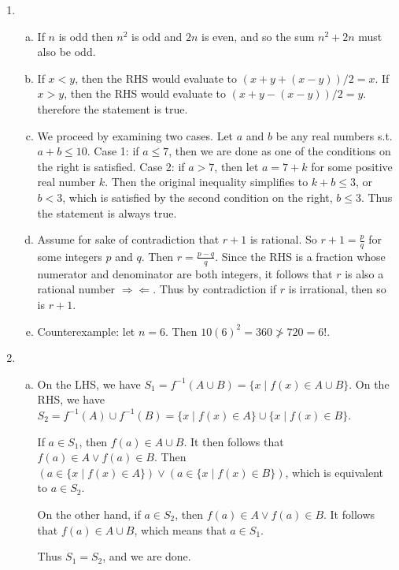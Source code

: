 \begin{enumerate}
    \item\begin{enumerate}[(a)]
        \item {} If $n$ is odd then $n^2$ is odd and $2n$ is even, and so the sum $n^2+2n$ must also be odd.
        \item {} If $x<y$, then the RHS would evaluate to $(x+y+(x-y))/2=x$. If $x>y$, then the RHS would evaluate to $(x+y-(x-y))/2=y$. therefore the statement is true.
        \item {} We proceed by examining two cases. Let $a$ and $b$ be any real numbers s.t. $a+b\leq10$. Case 1: if $a\leq7$, then we are done as one of the conditions on the right is satisfied. Case 2: if $a>7$, then let $a=7+k$ for some positive real number $k$. Then the original inequality simplifies to $k+b\leq3$, or $b<3$, which is satisfied by the second condition on the right, $b\leq3$. Thus the statement is always true.
        \item {} Assume for sake of contradiction that $r+1$ is rational. So $r+1=\frac{p}{q}$ for some integers $p$ and $q$. Then $r=\frac{p-q}{q}$. Since the RHS is a fraction whose numerator and denominator are both integers, it follows that $r$ is also a rational number $\Rightarrow\Leftarrow$. Thus by contradiction if $r$ is irrational, then so is $r+1$.
        \item {} Counterexample: let $n=6$. Then $10(6)^2=360\ngtr720=6!$.
    \end{enumerate}
    
    \item\begin{enumerate}[(a)]
        \item On the LHS, we have $S_1=f^{-1}(A\cup B)=\{x\mid f(x)\in A\cup B\}$. On the RHS, we have $S_2=f^{-1}(A)\cup f^{-1}(B)=\{x\mid f(x)\in A\}\cup\{x\mid f(x)\in B\}$.

        If $a\in S_1$, then $f(a)\in A\cup B$. It then follows that $f(a)\in A \vee f(a)\in B$. Then $(a\in\{x\mid f(x)\in A\})\vee (a\in\{x\mid f(x)\in B\})$, which is equivalent to $a\in S_2$.
        
        On the other hand, if $a\in S_2$, then $f(a)\in A \vee f(a)\in B$. It follows that $f(a)\in A\cup B$, which means that $a\in S_1$.
        
        Thus $S_1=S_2$, and we are done.
        

\end{enumerate}
\end{enumerate}
